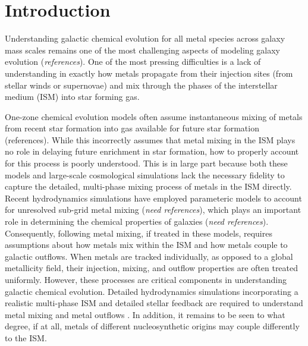\documentclass[twocolumn]{aastex61}
\begin{document}
\keywords{}

\section{Introduction}
Understanding galactic chemical evolution for all metal species across galaxy mass scales remains one of the most challenging aspects of modeling galaxy evolution (\textit{references}). One of the most pressing difficulties is a lack of understanding in exactly how metals propagate from their injection sites (from stellar winds or supernovae) and mix through the phases of the interstellar medium (ISM) into star forming gas. 
%
%

One-zone chemical evolution models often assume instantaneous mixing of metals from recent star formation into gas available for future star formation (references). While this incorrectly assumes that metal mixing in the ISM plays no role in delaying future enrichment in star formation, how to properly account for this process is poorly understood. This is in large part because both these models and large-scale cosmological simulations lack the necessary fidelity to capture the detailed, multi-phase mixing process of metals in the ISM directly. Recent hydrodynamics simulations have employed parameteric models to account for unresolved sub-grid metal mixing (\textit{need references}), which plays an important role in determining the chemical properties of galaxies (\textit{need references}). Consequently, following metal mixing, if treated in these models, requires assumptions about how metals mix within the ISM and how metals couple to galactic outflows. When metals are tracked individually, as opposed to a global metallicity field, their injection, mixing, and outflow properties are often treated uniformly. However, these processes are critical components in understanding galactic chemical evolution. Detailed hydrodynamics simulations incorporating a realistic multi-phase ISM and detailed stellar feedback are required to understand metal mixing and metal outflows \citep[e.g.][]{Armillotta2018}. In addition, it remains to be seen to what degree, if at all, metals of different nucleosynthetic origins may couple differently to the ISM. 
\end{document}

